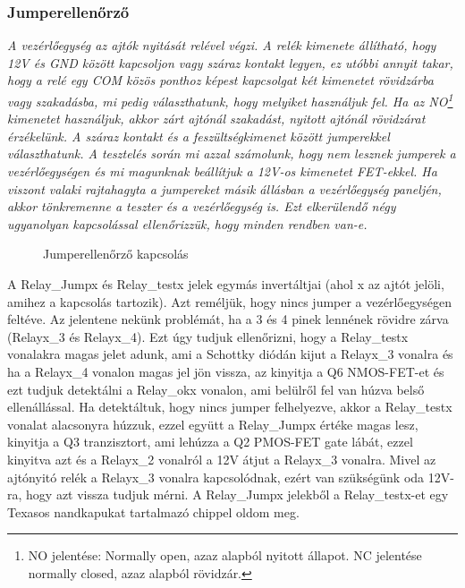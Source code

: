 \documentclass[a4paper, 12pt]{article}
\newcommand{\tab}{\hspace*{1em}}
\begin{document}
\subsubsection{Jumperellenőrző}
\emph{\tab A vezérlőegység az ajtók nyitását relével végzi. A relék kimenete állítható, hogy 12V és GND között kapcsoljon vagy száraz kontakt legyen, ez utóbbi annyit takar, hogy a relé egy COM közös ponthoz képest kapcsolgat két kimenetet rövidzárba vagy szakadásba, mi pedig választhatunk, hogy melyiket használjuk fel. Ha az NO\footnote{NO jelentése: Normally open, azaz alapból nyitott állapot. NC jelentése normally closed, azaz alapból rövidzár.} kimenetet használjuk, akkor zárt ajtónál szakadást, nyitott ajtónál rövidzárat érzékelünk. A száraz kontakt és a feszültségkimenet között jumperekkel választhatunk. A tesztelés során mi azzal számolunk, hogy nem lesznek jumperek a vezérlőegységen és mi magunknak beállítjuk a 12V-os kimenetet FET-ekkel. Ha viszont valaki rajtahagyta a jumpereket másik állásban a vezérlőegység paneljén, akkor tönkremenne a teszter és a vezérlőegység is. Ezt elkerülendő négy ugyanolyan kapcsolással ellenőrizzük, hogy minden rendben van-e.}
\begin{figure}[H]
    \centering
    \caption{Jumperellenőrző kapcsolás}
\end{figure}
A Relay\_Jumpx és Relay\_testx jelek egymás invertáltjai (ahol x az ajtót jelöli, amihez a kapcsolás tartozik). Azt reméljük, hogy nincs jumper a vezérlőegységen feltéve. Az jelentene nekünk problémát, ha a 3 és 4 pinek lennének rövidre zárva (Relayx\_3 és Relayx\_4). Ezt úgy tudjuk ellenőrizni, hogy a Relay\_testx vonalakra magas jelet adunk, ami a Schottky diódán kijut a Relayx\_3 vonalra és ha a Relayx\_4 vonalon magas jel jön vissza, az kinyitja a Q6 NMOS-FET-et és ezt tudjuk detektálni a Relay\_okx vonalon, ami belülről fel van húzva belső ellenállással. Ha detektáltuk, hogy nincs jumper felhelyezve, akkor a Relay\_testx vonalat alacsonyra húzzuk, ezzel együtt a Relay\_Jumpx értéke magas lesz, kinyitja a Q3 tranzisztort, ami lehúzza a Q2 PMOS-FET gate lábát, ezzel kinyitva azt és a Relayx\_2 vonalról a 12V átjut a Relayx\_3 vonalra. Mivel az ajtónyitó relék a Relayx\_3 vonalra kapcsolódnak, ezért van szükségünk oda 12V-ra, hogy azt vissza tudjuk mérni.
A Relay\_Jumpx jelekből a  Relay\_testx-et egy Texasos nandkapukat tartalmazó chippel oldom meg. \cite{sn74}
\end{document}
